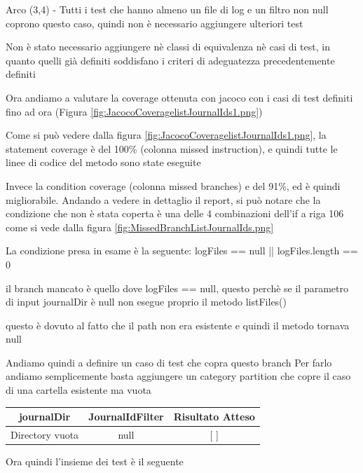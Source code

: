 \documentclass[12pt, a4paper]{article}
\begin{document}
Arco (3,4)  -\> Tutti i test che hanno almeno un file di log e un filtro non null coprono questo caso, quindi non è necessario aggiungere ulteriori test



Non è stato necessario aggiungere nè classi di equivalenza nè casi di test,
in quanto quelli già definiti soddisfano i criteri di adeguatezza precedentemente definiti

Ora andiamo a valutare la coverage ottenuta con jacoco con i casi di test definiti
fino ad ora (Figura \ref{fig:JacocoCoveragelistJournalIds1.png})

Come si può vedere dalla figura \ref{fig:JacocoCoveragelistJournalIds1.png},
la statement coverage è del 100\% (colonna missed instruction), 
e quindi tutte le linee di codice del metodo sono state eseguite

Invece la condition coverage (colonna missed branches) e del 91\%, ed è quindi migliorabile.
Andando a vedere in dettaglio il report, si può notare che la condizione che non è stata coperta
è una delle 4 combinazioni dell'if a riga 106 come si vede dalla figura \ref{fig:MissedBranchListJournalIds.png}

La condizione presa in esame è la seguente:
logFiles == null || logFiles.length == 0

il branch mancato è quello dove logFiles == null, questo perchè se il parametro di input journalDir è null non esegue proprio il metodo listFiles()


questo è dovuto al fatto che il path non era esistente e quindi il metodo tornava null

Andiamo quindi a definire un caso di test che copra questo branch
Per farlo andiamo semplicemente basta aggiungere un category partition che copre il caso di una cartella esistente ma vuota

\begin{table}[ht]
\centering
\begin{tabular}{|c|c|c|}
  \hline
  journalDir & JournalIdFilter & Risultato Atteso \\
  \hline
  {Directory vuota} & null & [ ] \\
  \hline
\end{tabular}
\end{table}

Ora quindi l'insieme dei test è il seguente
\end{document}
